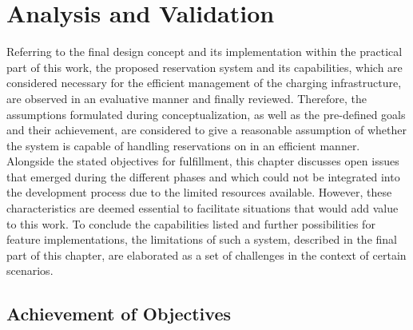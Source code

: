 
\chapter{Analysis and Validation}
\label{ch:Analysis and Validation}

Referring to the final design concept and its implementation within the practical part of this work, the proposed reservation system and its capabilities, which are considered necessary for the efficient management of the charging infrastructure, are observed in an evaluative manner and finally reviewed.
Therefore, the assumptions formulated during conceptualization, as well as the pre-defined goals and their achievement, are considered to give a reasonable assumption of whether the system is capable of handling reservations on  in an efficient manner.
Alongside the stated objectives for fulfillment, this chapter discusses open issues that emerged during the different phases and which could not be integrated into the development process due to the limited resources available. However, these characteristics are deemed essential to facilitate situations that would add value to this work.
To conclude the capabilities listed and further possibilities for feature implementations, the limitations of such a system, described in the final part of this chapter, are elaborated as a set of challenges in the context of certain scenarios. 

\section{Achievement of Objectives}
\label{ch:Analysis and Validation:sec:Achievement of Objectives}

